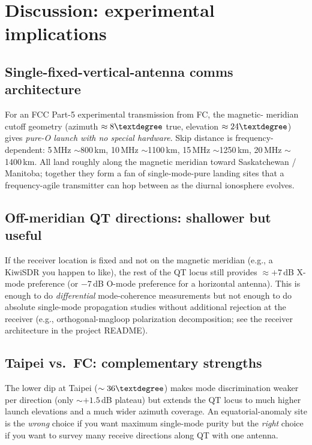 \documentclass[11pt]{article}
\begin{document}
\section{Discussion: experimental implications}

\subsection*{Single-fixed-vertical-antenna comms architecture}

For an FCC Part-5 experimental transmission from FC, the magnetic-
meridian cutoff geometry (azimuth $\approx 8\textdegree$ true,
elevation $\approx 24\textdegree$) gives \emph{pure-O launch with no
special hardware}.  Skip distance is frequency-dependent: 5\,MHz
$\sim$800\,km, 10\,MHz $\sim$1100\,km, 15\,MHz $\sim$1250\,km,
20\,MHz $\sim$1400\,km.  All land roughly along the magnetic meridian
toward Saskatchewan / Manitoba; together they form a fan of
single-mode-pure landing sites that a frequency-agile transmitter can
hop between as the diurnal ionosphere evolves.

\subsection*{Off-meridian QT directions: shallower but useful}

If the receiver location is fixed and not on the magnetic meridian
(e.g., a KiwiSDR you happen to like), the rest of the QT locus still
provides $\approx +7\,$dB X-mode preference (or $-7\,$dB O-mode
preference for a horizontal antenna).  This is enough to do
\emph{differential} mode-coherence measurements but not enough to do
absolute single-mode propagation studies without additional rejection
at the receiver (e.g., orthogonal-magloop polarization decomposition;
see the receiver architecture in the project README).

\subsection*{Taipei vs.\ FC: complementary strengths}

The lower dip at Taipei ($\sim 36\textdegree$) makes mode
discrimination weaker per direction (only $\sim +1.5\,$dB plateau)
but extends the QT locus to much higher launch elevations and a
much wider azimuth coverage.  An equatorial-anomaly site is the
\emph{wrong} choice if you want maximum single-mode purity but the
\emph{right} choice if you want to survey many receive directions
along QT with one antenna.
\end{document}
